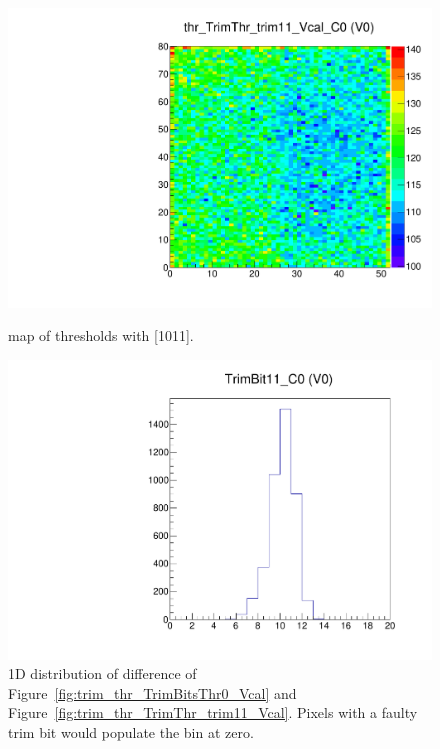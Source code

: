 \begin{figure}[!htp]
\centering
\begin{minipage}{0.45\textwidth}
  \includegraphics[width=1.0\textwidth]{figures/trim_thr_TrimThr_trim11_Vcal.pdf}
  \caption{\roc map of \vcal thresholds with  [1011].}
  \label{fig:trim_thr_TrimThr_trim11_Vcal}
\end{minipage}
\hspace{0.3cm}
\begin{minipage}{0.45\textwidth}
  \includegraphics[width=1.0\textwidth]{figures/trim_TrimBit11.pdf}
  \caption{1D distribution of difference of Figure~\ref{fig:trim_thr_TrimBitsThr0_Vcal} and Figure~\ref{fig:trim_thr_TrimThr_trim11_Vcal}.
           Pixels with a faulty trim bit would populate the bin at zero.}
  \label{fig:trim_TrimBit11}
\end{minipage}
\end{figure}

